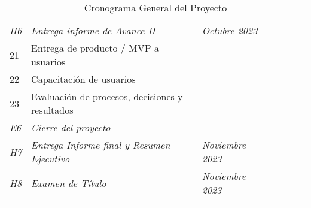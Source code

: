 \begin{longtable}[c]{@{}llllllll@{}}
	\textit{H6}                            & \textit{Entrega informe de Avance II}               & \multicolumn{2}{l}{\textit{Octubre 2023}}    & \textit{}                                & \textit{}     & \textit{}      & \textit{}                          \\
	21                                     & Entrega de producto / MVP a usuarios                &                                              &                                          &               &                &                  &                 \\
	22                                     & Capacitación de usuarios                            &                                              &                                          &               &                &                  &                 \\
	23                                     & Evaluación de procesos, decisiones y resultados     &                                              &                                          &               &                &                  &                 \\
	\textit{E6}                            & \textit{Cierre del proyecto}                        & \textit{}                                    & \textit{}                                & \textit{}     & \textit{}      & \textit{}        & \textit{}       \\
	\textit{H7}                            & \textit{Entrega Informe final y Resumen Ejecutivo}  & \multicolumn{2}{l}{\textit{Noviembre 2023}}  & \textit{}                                & \textit{}     & \textit{}      & \textit{}                          \\
	\textit{H8}                            & \textit{Examen de Título}                           & \multicolumn{2}{l}{\textit{Noviembre 2023}}  & \textit{}                                & \textit{}     & \textit{}      & \textit{}                          \\* \bottomrule
	\caption{Cronograma General del Proyecto}
	\label{tab:cronograma}                                                                                                                                                                                                                                       \\
\end{longtable}
